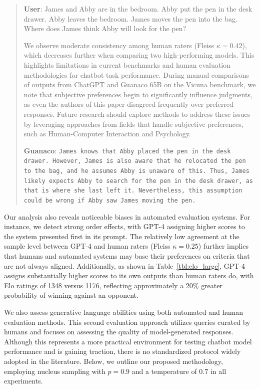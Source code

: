 \begin{quote}
    \textbf{User}: James and Abby are in the bedroom. Abby put the pen in the desk drawer. Abby leaves the bedroom. James moves the pen into the bag. Where does James think Abby will look for the pen?

We observe moderate consistency among human raters (Fleiss $\kappa=0.42$), which decreases further when comparing two high-performing models. This highlights limitations in current benchmarks and human evaluation methodologies for chatbot task performance. During manual comparisons of outputs from ChatGPT and {Guanaco} 65B on the Vicuna benchmark, we note that subjective preferences begin to significantly influence judgments, as even the authors of this paper disagreed frequently over preferred responses. Future research should explore methods to address these issues by leveraging approaches from fields that handle subjective preferences, such as Human-Computer Interaction and Psychology.

    \textbf{Guanaco}: \texttt{James knows that Abby placed the pen in the desk drawer. However, James is also aware that he relocated the pen to the bag, and he assumes Abby is unaware of this. Thus, James likely expects Abby to search for the pen in the desk drawer, as that is where she last left it. Nevertheless, this assumption could be wrong if Abby saw James moving the pen.}
\end{quote}

Our analysis also reveals noticeable biases in automated evaluation systems. For instance, we detect strong order effects, with GPT-4 assigning higher scores to the system presented first in its prompt. The relatively low agreement at the sample level between GPT-4 and human raters (Fleiss $\kappa=0.25$) further implies that humans and automated systems may base their preferences on criteria that are not always aligned. Additionally, as shown in Table~\ref{tbl:elo_large}, GPT-4 assigns substantially higher scores to its own outputs than human raters do, with Elo ratings of 1348 versus 1176, reflecting approximately a 20\% greater probability of winning against an opponent.

We also assess generative language abilities using both automated and human evaluation methods. This second evaluation approach utilizes queries curated by humans and focuses on assessing the quality of model-generated responses. Although this represents a more practical environment for testing chatbot model performance and is gaining traction, there is no standardized protocol widely adopted in the literature. Below, we outline our proposed methodology, employing nucleus sampling with $p=0.9$ and a temperature of $0.7$ in all experiments.

